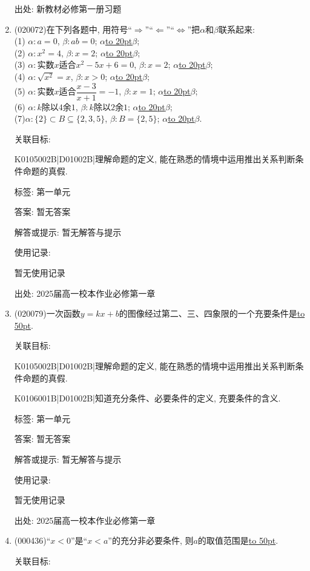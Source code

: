 \documentclass[10pt,a4paper]{article}
\newcommand{\blank}[1]{\underline{\hbox to #1pt{}}}
\begin{document}
\begin{enumerate}[1.]
出处: 新教材必修第一册习题
\item { (020072)}在下列各题中, 用符号``$\Rightarrow$''``$\Leftarrow$''``$\Leftrightarrow$''把$\alpha$和$\beta$联系起来:\\
(1) $\alpha:a=0$, $\beta:ab=0$; $\alpha$\blank{20}$\beta$;\\
(2) $\alpha:x^2=4$, $\beta:x=2$; $\alpha$\blank{20}$\beta$;\\
(3) $\alpha:$实数$x$适合$x^2-5x+6=0$, $\beta:x=2$; $\alpha$\blank{20}$\beta$;\\
(4) $\alpha:\sqrt {x^2}=x$, $\beta:x>0$; $\alpha$\blank{20}$\beta$;\\
(5) $\alpha:$实数$x$适合$\dfrac{x-3}{x+1}=-1$, $\beta:x=1$; $\alpha$\blank{20}$\beta$;\\
(6) $\alpha:k$除以$4$余$1$, $\beta:k$除以$2$余$1$; $\alpha$\blank{20}$\beta$;\\
(7)$\alpha: \{2\}\subset B\subseteq \{2, 3, 5\}$, $\beta:B=\{2, 5\}$; $\alpha$\blank{20}$\beta$.


关联目标:

K0105002B|D01002B|理解命题的定义, 能在熟悉的情境中运用推出关系判断条件命题的真假.



标签: 第一单元

答案: 暂无答案

解答或提示: 暂无解答与提示

使用记录:

暂无使用记录


出处: 2025届高一校本作业必修第一章
\item { (020079)}一次函数$y=kx+b$的图像经过第二、三、四象限的一个充要条件是\blank{50}.


关联目标:

K0105002B|D01002B|理解命题的定义, 能在熟悉的情境中运用推出关系判断条件命题的真假.

K0106001B|D01002B|知道充分条件、必要条件的定义, 充要条件的含义.



标签: 第一单元

答案: 暂无答案

解答或提示: 暂无解答与提示

使用记录:

暂无使用记录


出处: 2025届高一校本作业必修第一章
\item { (000436)}``$x<0$''是``$x<a$''的充分非必要条件, 则$a$的取值范围是\blank{50}.


关联目标:


\end{enumerate}
\end{document}
